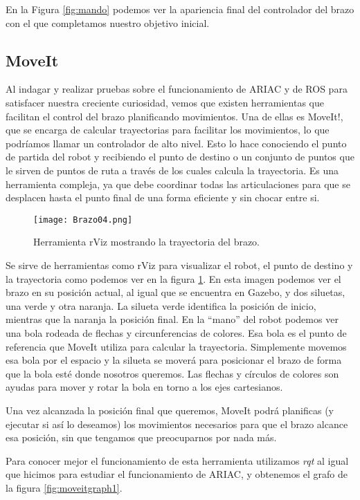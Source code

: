 En la Figura \ref{fig:mando} podemos ver la apariencia final del controlador del brazo con el que completamos nuestro objetivo inicial.


\subsection{MoveIt}
\label{subsec:br_moveit}

Al indagar y realizar pruebas sobre el funcionamiento de ARIAC y de ROS para satisfacer nuestra creciente curiosidad, vemos que existen herramientas que facilitan el control del brazo planificando movimientos. Una de ellas es MoveIt!, que se encarga de calcular trayectorias para facilitar los movimientos, lo que podríamos llamar un controlador de alto nivel. Esto lo hace conociendo el punto de partida del robot y recibiendo el punto de destino o un conjunto de puntos que le sirven de puntos de ruta a través de los cuales calcula la trayectoria. Es una herramienta compleja, ya que debe coordinar todas las articulaciones para que se desplacen hasta el punto final de una forma eficiente y sin chocar entre si. 

\begin{figure}[h]
	\centering
	\texttt{[image: Brazo04.png]}
	\caption{Herramienta rViz mostrando la trayectoria del brazo.} \label{fig:rviz}
\end{figure}

Se sirve de herramientas como rViz para visualizar el robot, el punto de destino y la trayectoria como podemos ver en la figura \ref{fig:rviz}. En esta imagen podemos ver el brazo en su posición actual, al igual que se encuentra en Gazebo, y dos siluetas, una verde y otra naranja. La silueta verde identifica la posición de inicio, mientras que la naranja la posición final. En la “mano” del robot podemos ver una bola rodeada de flechas y circunferencias de colores. Esa bola es el punto de referencia que MoveIt utiliza para calcular la trayectoria. Simplemente movemos esa bola por el espacio y la silueta se moverá para posicionar el brazo de forma que la bola esté donde nosotros queremos. Las flechas y círculos de colores son ayudas para mover y rotar la bola en torno a los ejes cartesianos. 

Una vez alcanzada la posición final que queremos, MoveIt podrá planificas (y ejecutar si así lo deseamos) los movimientos necesarios para que el brazo alcance esa posición, sin que tengamos que preocuparnos por nada más.

Para conocer mejor el funcionamiento de esta herramienta utilizamos \textit{rqt} al igual que hicimos para estudiar el funcionamiento de ARIAC, y obtenemos el grafo de la figura \ref{fig:moveitgraph1}.


